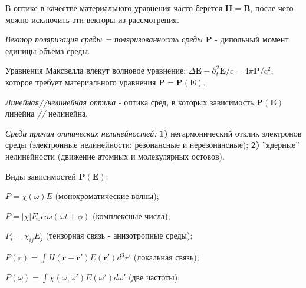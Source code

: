 В оптике в качестве материального уравнения часто берется $\mathbf{H}=\mathbf{B}$, после чего можно исключить эти векторы из рассмотрения.

\begin{to_def}
    \textit{Вектор поляризация среды = поляризованность среды $\mathbf{P}$} - дипольный момент единицы объема среды.
\end{to_def}

Уравнения Максвелла влекут волновое уравнение: $\Delta \mathbf{E}- \partial_t^2 \mathbf{E}/c=4\pi \mathbf{P}/c^{2}$, которое требует материального уравнения $\mathbf{P} = \mathbf{P}(\mathbf{E})$.

\begin{to_def}
    \textit{Линейная//нелинейная оптика} - оптика сред, в которых зависимость $\mathbf{P}(\mathbf{E})$ линейна \textit{//} нелинейна.
\end{to_def}

\textit{Среди причин оптических нелинейностей:} \textbf{1)} негармонический отклик электронов среды (электронные нелинейности: резонансные и нерезонансные);  \textbf{2)} ''ядерные'' нелинейности (движение атомных и молекулярных остовов).


Виды зависимостей $\mathbf{P}(\mathbf{E})$:
\begin{enumerate*}
    \item $P=\chi (\omega) E$ (монохроматические волны); 
    \item $P=|\chi|E_{0}cos(\omega t + \phi)$ (комплексные числа); 
    \item $P_{i}=\chi_{ij}E_{j}$ (тензорная связь - анизотропные среды); 
    \item $P(\mathbf{r}) = \int H(\mathbf{r}-\mathbf{r}') E(\mathbf{r}') d^{3}r'$ (локальная связь); 
    \item $P(\omega) = \int \chi (\omega, \omega') E(\omega') d\omega'$ (две частоты);
\end{enumerate*}